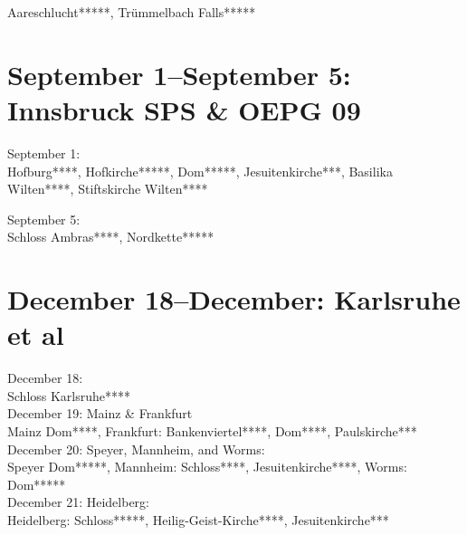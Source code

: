 Aareschlucht*****, Tr\"ummelbach Falls*****

\section{September 1--September 5: Innsbruck SPS \& OEPG 09}
\label{2009:Innsbruck}

September 1:\\

Hofburg****, Hofkirche*****, Dom*****, Jesuitenkirche***, Basilika Wilten****, Stiftskirche Wilten****

September 5:\\

Schloss Ambras****, Nordkette*****

\section{December 18--December: Karlsruhe et al}

December 18:\\
Schloss Karlsruhe****\\

December 19: Mainz \& Frankfurt\\
Mainz Dom****, Frankfurt: Bankenviertel****, Dom****, Paulskirche***\\

December 20: Speyer, Mannheim, and Worms:\\
Speyer Dom*****, Mannheim: Schloss****, Jesuitenkirche****, Worms: Dom*****\\

December 21: Heidelberg:\\
Heidelberg: Schloss*****, Heilig-Geist-Kirche****, Jesuitenkirche***